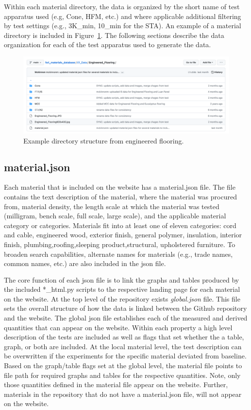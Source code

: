 \documentclass[12pt,oneside]{book}
\begin{document}
Within each material directory, the data is organized by the short name of test apparatus used (e.g, Cone, HFM, etc.) and where applicable additional filtering by test settings (e.g., 3K\_min, 10\_min for the STA). An example of a material directory is included in Figure~\ref{fig:mat_example}. The following sections describe the data organization for each of the test apparatus used to generate the data.

\begin{figure}[!ht]
\centering
\includegraphics[width=.95\columnwidth]{Figures/engineered_flooring_example}
\caption[Engineered Flooring Material Directory Example]{Example directory structure from engineered flooring.}
\label{fig:mat_example}
\end{figure}

\subsection{material.json}
Each material that is included on the website has a material.json file. The file contains the text description of the material, where the material was procured from, material density, the length scale at which the material was tested (milligram, bench scale, full scale, large scale), and the applicable material category or categories. Materials fit into at least one of eleven categories: cord and cable, engineered wood, exterior finish, general polymer, insulation, interior finish, plumbing,roofing,sleeping product,structural, upholstered furniture. To broaden search capabilities, alternate names for materials (e.g., trade names, common names, etc.) are also included in the json file.

The core function of each json file is to link the graphs and tables produced by the included *\_html.py scripts to the respective landing page for each material on the website. At the top level of the repository exists {\em global.json} file. This file sets the overall structure of how the data is linked between the Github repository and the  website. The global json file establishes each of the measured and derived quantities that can appear on the website. Within each property a high level description of the tests are included as well as flags that set whether the a table, graph, or both are included. At the local material level, the test description can be overwritten if the experiments for the specific material deviated from baseline. Based on the graph/table flags set at the global level, the material file points to file path for required graphs and tables for the respective quantities. Note, only those quantities defined in the material file appear on the website. Further, materials in the repository that do not have a material.json file, will not appear on the website.
\end{document}
